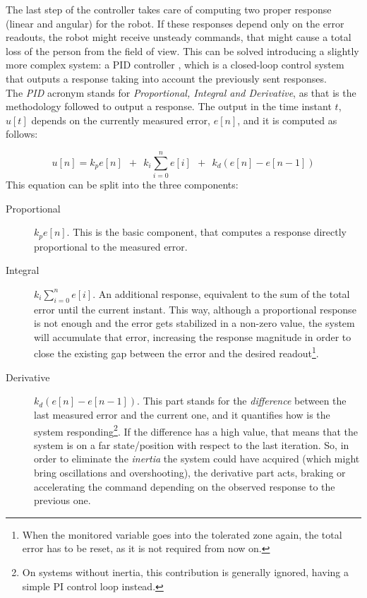 The last step of the controller takes care of computing two proper response (linear and angular) for the robot. If these responses depend only on the error readouts, the robot might receive unsteady commands, that might cause a total loss of the person from the field of view. This can be solved introducing a slightly more complex system: a PID controller \cite{pid_controllers}, which is a closed-loop control system that outputs a response taking into account the previously sent responses.\\

The \textit{PID} acronym stands for \textit{Proportional, Integral and Derivative}, as that is the methodology followed to output a response. The output in the time instant $t$, $u[t]$ depends on the currently measured error, $e[n]$, and it is computed as follows: 

\begin{equation}
u[n] = k_p e[n] \ \ + \ \ k_i \sum_{i=0}^{n}e[i] \ \ + \ \ k_d (e[n] - e[n-1])
\label{eq:6_pid}
\end{equation}
This equation can be split into the three components:
\begin{description}
	\item[Proportional] $k_p e[n]$. This is the basic component, that computes a response directly proportional to the measured error.
	\item[Integral] $k_i \sum_{i=0}^{n}e[i]$. An additional response, equivalent to the sum of the total error until the current instant. This way, although a proportional response is not enough and the error gets stabilized in a non-zero value, the system will accumulate that error, increasing the response magnitude in order to close the existing gap between the error and the desired readout\footnote{When the monitored variable goes into the tolerated zone again, the total error has to be reset, as it is not required from now on.}.
	\item[Derivative] $k_d (e[n] - e[n-1])$. This part stands for the \emph{difference} between the last measured error and the current one, and it quantifies how is the system responding\footnote{On systems without inertia, this contribution is generally ignored, having a simple PI control loop instead.}. If the difference has a high value, that means that the system is on a far state/position with respect to the last iteration. So, in order to eliminate the \emph{inertia} the system could have acquired (which might bring oscillations and overshooting), the derivative part acts, braking or accelerating the command depending on the observed response to the previous one.
\end{description}




